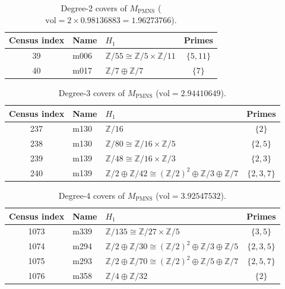 \documentclass[12pt]{article}
\theoremstyle{definition}
\begin{document}
\begin{table}[htbp]
\centering
\caption{Degree-2 covers of $M_{\mathrm{PMNS}}$
  ($\mathrm{vol} = 2 \times 0.98136883 = 1.96273766$).}
\label{tab:deg2}
\begin{tabular}{cllc}
\toprule
Census index & Name & $H_1$ & Primes \\
\midrule
39 & m006 & $\mathbb{Z}/55 \cong \mathbb{Z}/5 \times \mathbb{Z}/11$
   & $\{5,11\}$ \\
40 & m017 & $\mathbb{Z}/7 \oplus \mathbb{Z}/7$
   & $\{7\}$ \\
\bottomrule
\end{tabular}
\end{table}

\begin{table}[htbp]
\centering
\caption{Degree-3 covers of $M_{\mathrm{PMNS}}$
  ($\mathrm{vol} = 2.94410649$).}
\label{tab:deg3}
\begin{tabular}{cllc}
\toprule
Census index & Name & $H_1$ & Primes \\
\midrule
237 & m130 & $\mathbb{Z}/16$ & $\{2\}$ \\
238 & m130 & $\mathbb{Z}/80 \cong \mathbb{Z}/16 \times \mathbb{Z}/5$
    & $\{2,5\}$ \\
239 & m139 & $\mathbb{Z}/48 \cong \mathbb{Z}/16 \times \mathbb{Z}/3$
    & $\{2,3\}$ \\
240 & m139
    & $\mathbb{Z}/2 \oplus \mathbb{Z}/42
       \cong (\mathbb{Z}/2)^2 \oplus \mathbb{Z}/3 \oplus \mathbb{Z}/7$
    & $\{2,3,7\}$ \\
\bottomrule
\end{tabular}
\end{table}

\begin{table}[htbp]
\centering
\caption{Degree-4 covers of $M_{\mathrm{PMNS}}$
  ($\mathrm{vol} = 3.92547532$).}
\label{tab:deg4}
\begin{tabular}{cllc}
\toprule
Census index & Name & $H_1$ & Primes \\
\midrule
1073 & m339
     & $\mathbb{Z}/135 \cong \mathbb{Z}/27 \times \mathbb{Z}/5$
     & $\{3,5\}$ \\
1074 & m294
     & $\mathbb{Z}/2 \oplus \mathbb{Z}/30
        \cong (\mathbb{Z}/2)^2 \oplus \mathbb{Z}/3 \oplus \mathbb{Z}/5$
     & $\{2,3,5\}$ \\
1075 & m293
     & $\mathbb{Z}/2 \oplus \mathbb{Z}/70
        \cong (\mathbb{Z}/2)^2 \oplus \mathbb{Z}/5 \oplus \mathbb{Z}/7$
     & $\{2,5,7\}$ \\
1076 & m358
     & $\mathbb{Z}/4 \oplus \mathbb{Z}/32$
     & $\{2\}$ \\
\bottomrule
\end{tabular}
\end{table}
\end{document}
